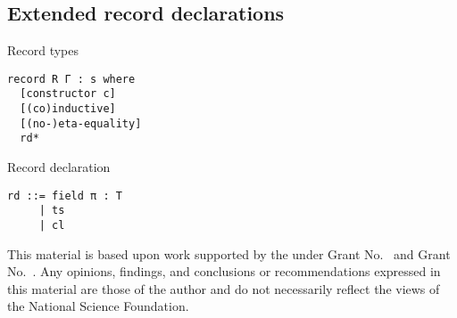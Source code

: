 \documentclass[acmlarge]{acmart}\settopmatter{}
\renewcommand{\|}{|}
\begin{document}
\subsection{Extended record declarations}

Record types
\begin{verbatim}
record R Γ : s where
  [constructor c]
  [(co)inductive]
  [(no-)eta-equality]
  rd*
\end{verbatim}

Record declaration
\begin{verbatim}
rd ::= field π : T
     | ts
     | cl 
\end{verbatim}


\begin{acks}                            %
  This material is based upon work supported by the
   under Grant
  No.~ and Grant
  No.~.  Any opinions, findings, and
  conclusions or recommendations expressed in this material are those
  of the author and do not necessarily reflect the views of the
  National Science Foundation.
\end{acks}


%


\end{document}

